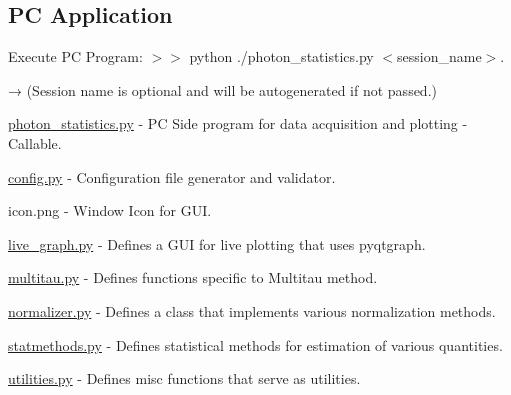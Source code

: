 \subsection*{PC Application}

Execute PC Program\+: {\ttfamily $>$$>$ python ./photon\+\_\+statistics.py $<$session\+\_\+name$>$}.

→ (Session name is optional and will be autogenerated if not passed.)


\begin{DoxyItemize}
\item {\ttfamily \hyperlink{photon__statistics_8py}{photon\+\_\+statistics.\+py}} -\/ PC Side program for data acquisition and plotting -\/ Callable. 


\item {\ttfamily \hyperlink{config_8py}{config.\+py}} -\/ Configuration file generator and validator.
\item {\ttfamily icon.\+png} -\/ Window Icon for G\+UI.
\item {\ttfamily \hyperlink{live__graph_8py}{live\+\_\+graph.\+py}} -\/ Defines a G\+UI for live plotting that uses {\ttfamily pyqtgraph}.
\item {\ttfamily \hyperlink{multitau_8py}{multitau.\+py}} -\/ Defines functions specific to Multitau method.
\item {\ttfamily \hyperlink{normalizer_8py}{normalizer.\+py}} -\/ Defines a class that implements various normalization methods.
\item {\ttfamily \hyperlink{statmethods_8py}{statmethods.\+py}} -\/ Defines statistical methods for estimation of various quantities.
\item {\ttfamily \hyperlink{utilities_8py}{utilities.\+py}} -\/ Defines misc functions that serve as utilities. 
\end{DoxyItemize}